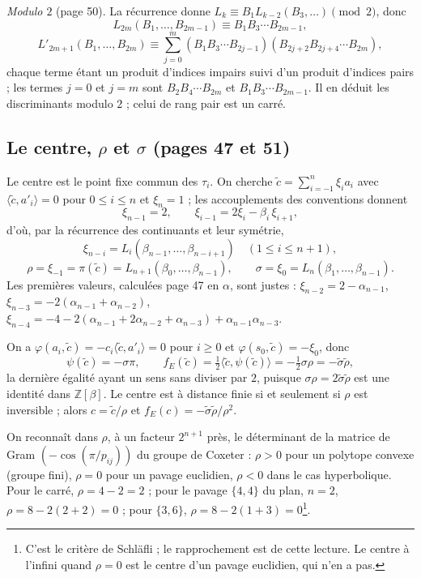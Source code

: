 \documentclass[11pt,a4paper]{article}
\begin{document}
\emph{Modulo $2$} (page 50). La récurrence donne $L_k \equiv B_1 L_{k-2}(B_3,
\ldots) \pmod 2$, donc
\[
L_{2m}(B_1, \ldots, B_{2m-1}) \equiv B_1 B_3 \cdots B_{2m-1},
\]
\[
L'_{2m+1}(B_1, \ldots, B_{2m}) \equiv \sum_{j=0}^{m} (B_1 B_3 \cdots
B_{2j-1})(B_{2j+2} B_{2j+4} \cdots B_{2m}),
\]
chaque terme étant un produit d'indices impairs suivi d'un produit d'indices
pairs ; les termes $j = 0$ et $j = m$ sont $B_2B_4 \cdots B_{2m}$ et $B_1 B_3
\cdots B_{2m-1}$. Il en déduit les discriminants modulo $2$ ; celui de rang pair
est un carré.

\subsection*{Le centre, $\rho$ et $\sigma$ (pages 47 et 51)}

Le centre est le point fixe commun des $\tau_i$. On cherche $\tilde c =
\sum_{i=-1}^{n} \xi_i a_i$ avec $\langle \tilde c, a'_i \rangle = 0$ pour $0
\leqslant i \leqslant n$ et $\xi_n = 1$ ; les accouplements des conventions
donnent
\[
\xi_{n-1} = 2, \qquad \xi_{i-1} = 2\xi_i - \beta_i\, \xi_{i+1} ,
\]
d'où, par la récurrence des continuants et leur symétrie,
\[
\xi_{n-i} = L_i(\beta_{n-1}, \ldots, \beta_{n-i+1}) \quad (1 \leqslant i
\leqslant n+1),
\]
\[
\rho = \xi_{-1} = \pi(\tilde c) = L_{n+1}(\beta_0, \ldots, \beta_{n-1}), \qquad
\sigma = \xi_0 = L_n(\beta_1, \ldots, \beta_{n-1}).
\]
Les premières valeurs, calculées page 47 en $\alpha$, sont justes : $\xi_{n-2}
= 2 - \alpha_{n-1}$, $\xi_{n-3} = -2(\alpha_{n-1} + \alpha_{n-2})$, $\xi_{n-4} = -4 -
2(\alpha_{n-1} + 2\alpha_{n-2} + \alpha_{n-3}) + \alpha_{n-1}\alpha_{n-3}$.

On a $\varphi(a_i, \tilde c) = -c_i\langle \tilde c, a'_i \rangle = 0$ pour $i
\geqslant 0$ et $\varphi(s_0, \tilde c) = -\xi_0$, donc
\[
\psi(\tilde c) = -\sigma\pi, \qquad f_E(\tilde c) = \tfrac12 \langle \tilde c,
\psi(\tilde c) \rangle = -\tfrac12\sigma\rho = -\tilde\sigma\tilde\rho ,
\]
la dernière égalité ayant un sens sans diviser par $2$, puisque $\sigma\rho =
2\tilde\sigma\tilde\rho$ est une identité dans $\mathbb{Z}[\beta]$. Le centre est
à distance finie si et seulement si $\rho$ est inversible ; alors $c = \tilde
c/\rho$ et $f_E(c) = -\tilde\sigma\tilde\rho/\rho^2$.

On reconnaît dans $\rho$, à un facteur $2^{n+1}$ près, le déterminant de la
matrice de Gram $(-\cos(\pi/p_{ij}))$ du groupe de Coxeter : $\rho > 0$ pour un
polytope convexe (groupe fini), $\rho = 0$ pour un pavage euclidien, $\rho < 0$
dans le cas hyperbolique. Pour le carré, $\rho = 4 - 2 = 2$ ; pour le pavage
$\{4, 4\}$ du plan, $n = 2$, $\rho = 8 - 2(2 + 2) = 0$ ; pour $\{3, 6\}$, $\rho =
8 - 2(1 + 3) = 0$\footnote{C'est le critère de Schläfli ; le rapprochement est
de cette lecture. Le centre à l'infini quand $\rho = 0$ est le centre d'un
pavage euclidien, qui n'en a pas.}.
\end{document}
